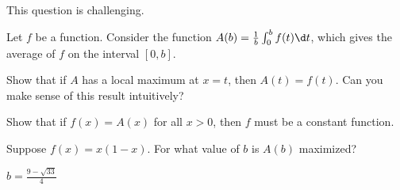 \documentclass{ximera}
\author{Steven Gubkin}
\begin{document}
\begin{exercise}



\begin{warning}
	This question is challenging.
\end{warning}

Let $f$ be a function.  Consider the function $A(b) = \frac{1}{b} \int_0^b f(t)\d t $, which gives the average of $f$ on the interval $[0,b]$.  

\begin{exercise}
Show that if $A$ has a local maximum at $x=t$, then $A(t) = f(t)$.   Can you make sense of this result intuitively?
\end{exercise}

\begin{exercise}
	Show that if $f(x) = A(x)$ for all $x >0$, then $f$ must be a constant function.
\end{exercise}

\begin{exercise}
	Suppose $f(x)  = x(1-x)$.  For what value of $b$ is $A(b)$ maximized?

	\begin{prompt}
		$b = \frac{9-\sqrt{33}}{4}$
	\end{prompt}
\end{exercise}

\end{exercise}
\end{document}
